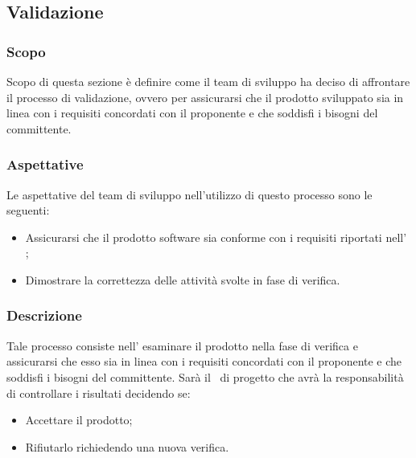 \pagebreak

\subsection{Validazione}\label{subsection: validazione}
\subsubsection{Scopo}
Scopo di questa sezione è definire come il team di sviluppo ha deciso di affrontare il processo di validazione, ovvero per assicurarsi che il prodotto sviluppato sia in linea con i requisiti concordati con il proponente e che soddisfi i bisogni del committente.
\subsubsection{Aspettative}
Le aspettative del team di sviluppo nell'utilizzo di questo processo sono le seguenti: 
\begin{itemize}
    \item Assicurarsi che il prodotto software sia conforme con i requisiti riportati nell' \docNameAdRLow;
    \item  Dimostrare la correttezza delle attività svolte in fase di verifica.
\end{itemize}
\subsubsection{Descrizione}
Tale processo consiste nell' esaminare il prodotto nella fase di verifica e assicurarsi che esso sia in linea con i requisiti concordati con il proponente e che soddisfi i bisogni del committente.
Sarà il \roleProjectManagerLow\ di progetto che avrà la responsabilità di controllare i risultati decidendo se:
\begin{itemize}
    \item Accettare il prodotto;
    \item Rifiutarlo richiedendo una nuova verifica.
\end{itemize}